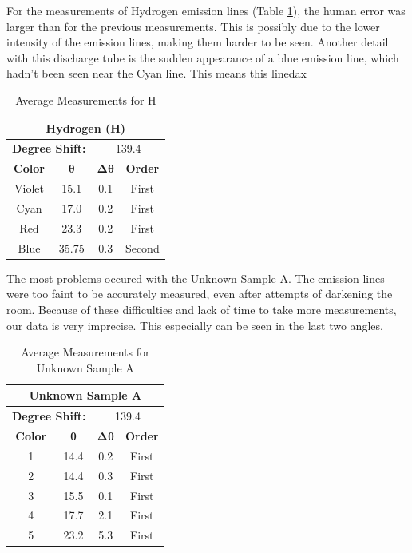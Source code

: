 \documentclass[a4paper, twocolumn]{article}
\begin{document}
For the measurements of Hydrogen emission lines (Table \ref{table:anglesH}), the human error was larger than for the 
previous measurements. This is possibly due to the lower intensity of the emission lines, making them harder to be seen.
Another detail with this discharge tube is the sudden appearance of a blue emission line, which hadn't been seen near
the Cyan line. This means this linedax
\begin{table}[h!]
\centering
\begin{tabular}{ |c||c|c|c| }
 \hline
 \multicolumn{4}{|c|}{\textbf{Hydrogen (H)}} \\
 \hline
 \multicolumn{2}{|c}{\textbf{Degree Shift:}} &
 \multicolumn{2}{|c|}{139.4} \\
 \hline
 \textbf{Color} & $\boldsymbol{\theta}$ & $\boldsymbol{\Delta\theta}$ & \textbf{Order} \\
 \hline
 Violet & 15.1 & 0.1 & First \\
 \hline
 Cyan & 17.0 & 0.2 & First \\ 
 \hline
 Red & 23.3 & 0.2 & First \\
 \hline
 Blue & 35.75 & 0.3 & Second \\
 \hline
\end{tabular}
\caption{Average Measurements for H}
\label{table:anglesH}
\end{table}

The most problems occured with the Unknown Sample A. The emission lines were too faint to be accurately measured, even after
attempts of darkening the room. Because of these difficulties and lack of time to take more measurements, our data is very
imprecise. This especially can be seen in the last two angles.
\begin{table}[h!]
\centering
\begin{tabular}{ |c||c|c|c| }
 \hline
 \multicolumn{4}{|c|}{\textbf{Unknown Sample A}} \\
 \hline
 \multicolumn{2}{|c}{\textbf{Degree Shift:}} &
 \multicolumn{2}{|c|}{139.4} \\
 \hline
 \textbf{Color} & $\boldsymbol{\theta}$ & $\boldsymbol{\Delta\theta}$ & \textbf{Order} \\
 \hline
 1 & 14.4 & 0.2 & First \\
 \hline
 2 & 14.4 & 0.3 & First \\
 \hline
 3 & 15.5 & 0.1 & First \\
 \hline
 4 & 17.7 & 2.1 & First \\
 \hline
 5 & 23.2 & 5.3 & First \\
 \hline
\end{tabular}
\caption{Average Measurements for Unknown Sample A}
\label{table:anglesA}
\end{table}
\end{document}
